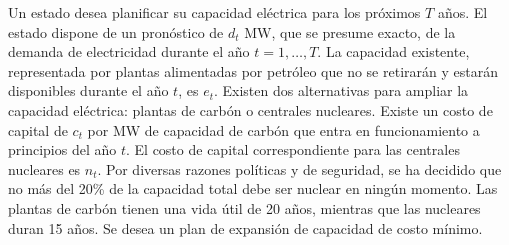 Un estado desea planificar su capacidad eléctrica para los próximos $T$ años. El estado dispone de un pronóstico de $d_t$ MW, que se presume exacto, de la demanda de electricidad durante el año $t = 1, \dots, T$. La capacidad existente, representada por plantas alimentadas por petróleo que no se retirarán y estarán disponibles durante el año $t$, es $e_t$. Existen dos alternativas para ampliar la capacidad eléctrica: plantas de carbón o centrales nucleares. Existe un costo de capital de $c_t$ por MW de capacidad de carbón que entra en funcionamiento a principios del año $t$. El costo de capital correspondiente para las centrales nucleares es $n_t$. Por diversas razones políticas y de seguridad, se ha decidido que no más del 20\% de la capacidad total debe ser nuclear en ningún momento. Las plantas de carbón tienen una vida útil de 20 años, mientras que las nucleares duran 15 años. Se desea un plan de expansión de capacidad de costo mínimo.
